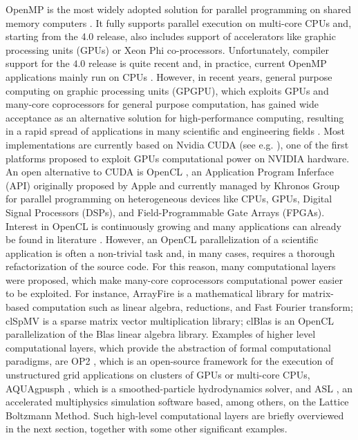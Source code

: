 OpenMP is the  most widely adopted solution for parallel programming on shared
  memory computers \cite{Chapman:2007:UOP:1370966}. It fully supports
  parallel execution on multi-core CPUs and, starting from the 4.0
  release, also includes support of accelerators like graphic
  processing units (GPUs) or Xeon Phi co-processors. Unfortunately,
  compiler support for the $4.0$ release is quite recent and, in
  practice, current OpenMP applications mainly run on CPUs
  \cite{Oliverio2011271, Amritkar2014501, pop:hal-00786675}. However,
  in recent years, general purpose computing on graphic processing
  units (GPGPU), which exploits GPUs and many-core coprocessors for
  general purpose computation, has gained wide acceptance as an
  alternative solution for high-performance computing, resulting in a
  rapid spread of applications in many scientific and engineering
  fields \cite{Owens200780}. Most implementations are currently based
  on Nvidia CUDA (see e.g. \cite{Blecic2013, D'Ambrosio2013630,
    DiGregorio20131183, D'Ambrosio201230}), one of the first platforms
  proposed to exploit GPUs computational power on NVIDIA hardware. An
  open alternative to CUDA is OpenCL \cite{Stone201066}, an
  Application Program Inferface (API) originally proposed by Apple and
  currently managed by Khronos Group for parallel programming on
  heterogeneous devices like CPUs, GPUs, Digital Signal Processors
  (DSPs), and Field-Programmable Gate Arrays (FPGAs). Interest in
  OpenCL is continuously growing and many applications can already be
  found in literature \cite{Macri2015328, Bedorf20122825, Du2012391,
    Brown2011898}. However, an OpenCL parallelization of a scientific
  application is often a non-trivial task and, in many cases, requires
  a thorough refactorization of the source code. For this reason, many
  computational layers were proposed, which make many-core
  coprocessors computational power easier to be exploited. For
  instance, ArrayFire \cite{Malcolm2012} is a mathematical library for
  matrix-based computation such as linear algebra, reductions, and
  Fast Fourier transform; clSpMV \cite{Su2012353} is a sparse matrix
  vector multiplication library; clBlas \cite{clBlas-2016} is an
  OpenCL parallelization of the Blas linear algebra library. Examples
  of higher level computational layers, which provide the abstraction
  of formal computational paradigms, are OP2 \cite{Giles20131451},
  which is an open-source framework for the execution of unstructured
  grid applications on clusters of GPUs or multi-core CPUs, AQUAgpusph
  \cite{Cercos-Pita2015295}, which is a smoothed-particle
  hydrodynamics solver, and ASL \cite{asl}, an accelerated
  multiphysics simulation software based, among others, on the Lattice
  Boltzmann Method. Such high-level computational layers are briefly
  overviewed in the next section, together with some other significant
  examples.

